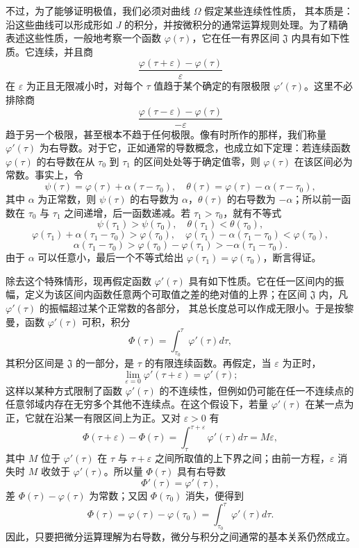 \documentclass[11pt,a4paper,leqno]{article}
\begin{document}
不过，为了能够证明极值，我们必须对曲线 $\Omega$ 假定某些连续性性质，
其本质是：沿这些曲线可以形成形如 $J$ 的积分，并按微积分的通常运算规则处理。为了精确表述这些性质，一般地考察一个函数 $\varphi(\tau)$，它在任一有界区间 $\mathfrak{J}$ 内具有如下性质。它连续，并且商
\[
\frac{\varphi(\tau+\varepsilon)-\varphi(\tau)}{\varepsilon}
\]
在 $\varepsilon$ 为正且无限减小时，对每个 $\tau$ 值趋于某个确定的有限极限 $\varphi'(\tau)$。这里不必排除商
\[
\frac{\varphi(\tau-\varepsilon)-\varphi(\tau)}{-\varepsilon}
\]
趋于另一个极限，甚至根本不趋于任何极限。像有时所作的那样，我们称量 $\varphi'(\tau)$ 为右导数。对于它，正如通常的导数概念，也成立如下定理：若连续函数 $\varphi(\tau)$ 的右导数在从 $\tau_0$ 到 $\tau_1$ 的区间处处等于确定值零，则 $\varphi(\tau)$ 在该区间必为常数。事实上，令
\[
\psi(\tau)=\varphi(\tau)+\alpha(\tau-\tau_0),
\quad \theta(\tau)=\varphi(\tau)-\alpha(\tau-\tau_0),
\]
其中 $\alpha$ 为正常数，则 $\psi(\tau)$ 的右导数为 $\alpha$，$\theta(\tau)$ 的右导数为 $-\alpha$；所以前一函数在 $\tau_0$ 与 $\tau_1$ 之间递增，后一函数递减。若 $\tau_1>\tau_0$，就有不等式
\[
\psi(\tau_1)>\psi(\tau_0),
\quad \theta(\tau_1)<\theta(\tau_0),
\]
\[
\varphi(\tau_1)+\alpha(\tau_1-\tau_0)>\varphi(\tau_0),
\quad \varphi(\tau_1)-\alpha(\tau_1-\tau_0)<\varphi(\tau_0),
\]
\[
\alpha(\tau_1-\tau_0)>\varphi(\tau_0)-\varphi(\tau_1)>-\alpha(\tau_1-\tau_0).
\]
由于 $\alpha$ 可以任意小，最后一个不等式给出 $\varphi(\tau_1)=\varphi(\tau_0)$，断言得证。

除去这个特殊情形，现再假定函数 $\varphi'(\tau)$ 具有如下性质。它在任一区间内的振幅，定义为该区间内函数任意两个可取值之差的绝对值的上界；在区间 $\mathfrak{J}$ 内，凡 $\varphi'(\tau)$ 的振幅超过某个正常数的各部分，
其总长度总可以作成无限小。于是按黎曼，函数 $\varphi'(\tau)$ 可积，积分
\[
\Phi(\tau)=\int_{\tau_0}^{\tau}\varphi'(\tau)d\tau,
\]
其积分区间是 $\mathfrak{J}$ 的一部分，是 $\tau$ 的有限连续函数。再假定，当 $\varepsilon$ 为正时，
\[
\lim_{\varepsilon=0}\varphi'(\tau+\varepsilon)=\varphi'(\tau);
\]
这样以某种方式限制了函数 $\varphi'(\tau)$ 的不连续性，但例如仍可能在任一不连续点的任意邻域内存在无穷多个其他不连续点。在这个假设下，若量 $\varphi'(\tau)$ 在某一点为正，它就在沿某一有限区间上为正。又对 $\varepsilon>0$ 有
\[
\Phi(\tau+\varepsilon)-\Phi(\tau)
=\int_{\tau}^{\tau+\varepsilon}\varphi'(\tau)d\tau=M\varepsilon,
\]
其中 $M$ 位于 $\varphi'(\tau)$ 在 $\tau$ 与 $\tau+\varepsilon$ 之间所取值的上下界之间；由前一方程，$\varepsilon$ 消失时 $M$ 收敛于 $\varphi'(\tau)$。所以量 $\Phi(\tau)$ 具有右导数
\[
\Phi'(\tau)=\varphi'(\tau),
\]
差 $\Phi(\tau)-\varphi(\tau)$ 为常数；又因 $\Phi(\tau_0)$ 消失，便得到
\[
\Phi(\tau)=\varphi(\tau)-\varphi(\tau_0)=\int_{\tau_0}^{\tau}\varphi'(\tau)d\tau.
\]
因此，只要把微分运算理解为右导数，微分与积分之间通常的基本关系仍然成立。
\end{document}
